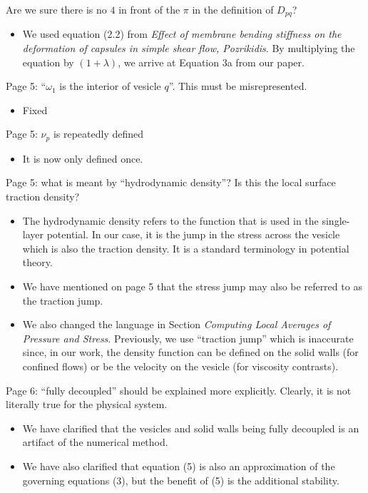 \documentclass[11pt]{article}
\newcommand{\comment}[1]{{\color{blue} #1}}
\begin{document}
\comment{Are we sure there is no $4$ in front of the $\pi$ in the
definition of $D_{pq}$?}
\begin{itemize}
  \item We used equation (2.2) from {\em Effect of membrane bending
  stiffness on the deformation of capsules in simple shear flow,
  Pozrikidis}.  By multiplying the equation by $(1+\lambda)$, we arrive
  at Equation 3a from our paper.
\end{itemize}


\comment{Page 5: ``$\omega_{1}$ is the interior of vesicle $q$''. This
must be misrepresented.}
\begin{itemize}
  \item Fixed
\end{itemize}


\comment{Page 5: $\nu_{p}$ is repeatedly defined}
\begin{itemize}
  \item It is now only defined once.
\end{itemize}


\comment{Page 5: what is meant by ``hydrodynamic density''? Is this the
local surface traction density?}
\begin{itemize}
  \item The hydrodynamic density refers to the function that
  is used in the single-layer potential.  In our case, it is the jump in
  the stress across the vesicle which is also the traction density. It
  is a standard terminology in potential theory. 

  \item We have mentioned on page 5 that the stress jump may also be
  referred to as the traction jump.

  \item We also changed the language in Section {\em Computing Local
  Averages of Pressure and Stress}.  Previously, we use ``traction
  jump'' which is inaccurate since, in our work, the density function
  can be defined on the solid walls (for confined flows) or be the
  velocity on the vesicle (for viscosity contrasts).
\end{itemize}


\comment{Page 6: ``fully decoupled'' should be explained more explicitly.
Clearly, it is not literally true for the physical system.}
\begin{itemize}
  \item We have clarified that the vesicles and solid walls being fully
  decoupled is an artifact of the numerical method.

  \item We have also clarified that equation (5) is also an
  approximation of the governing equations (3), but the benefit of (5)
  is the additional stability.
\end{itemize}
\end{document}
